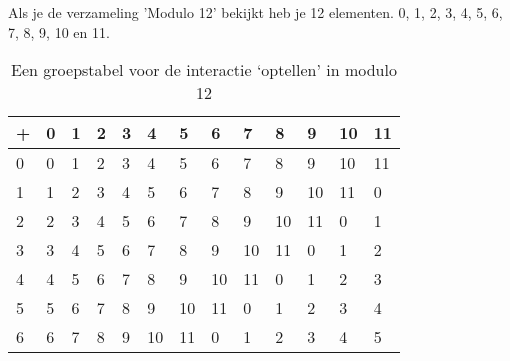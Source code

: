 \documentclass[12pt]{report}
\begin{document}
Als je de verzameling 'Modulo 12' bekijkt heb je 12 elementen. 0, 1, 2, 3, 4, 5, 6, 7, 8, 9, 10 en 11.
\begin{table}[]
	\centering
	\caption{Een groepstabel voor de interactie `optellen' in modulo 12}
	\begin{tabular}{|l|llllllllllll}
		\hline
		+  & \multicolumn{1}{l|}{0} & \multicolumn{1}{l|}{1} & \multicolumn{1}{l|}{2} & \multicolumn{1}{l|}{3} & \multicolumn{1}{l|}{4} & \multicolumn{1}{l|}{5} & \multicolumn{1}{l|}{6} & \multicolumn{1}{l|}{7} & \multicolumn{1}{l|}{8} & \multicolumn{1}{l|}{9} & \multicolumn{1}{l|}{10} & \multicolumn{1}{l|}{11} \\ \hline
		0  & 0                      & 1                      & 2                      & 3                      & 4                      & 5                      & 6                      & 7                      & 8                      & 9  & 10 & 11 \\ \cline{1-1}
		1  & 1                      & 2                      & 3                      & 4                      & 5                      & 6                      & 7                      & 8                      & 9                      & 10 & 11 & 0  \\ \cline{1-1}
		2  & 2                      & 3                      & 4                      & 5                      & 6                      & 7                      & 8                      & 9                      & 10                     & 11 & 0  & 1  \\ \cline{1-1}
		3  & 3                      & 4                      & 5                      & 6                      & 7                      & 8                      & 9                      & 10                     & 11                     & 0  & 1  & 2  \\ \cline{1-1}
		4  & 4                      & 5                      & 6                      & 7                      & 8                      & 9                      & 10                     & 11                     & 0                      & 1  & 2  & 3  \\ \cline{1-1}
		5  & 5                      & 6                      & 7                      & 8                      & 9                      & 10                     & 11                     & 0                      & 1                      & 2  & 3  & 4  \\ \cline{1-1}
		6  & 6                      & 7                      & 8                      & 9                      & 10                     & 11                     & 0                      & 1                      & 2                      & 3  & 4  & 5  \\ \cline{1-1}

\end{tabular}
\end{table}
\end{document}
